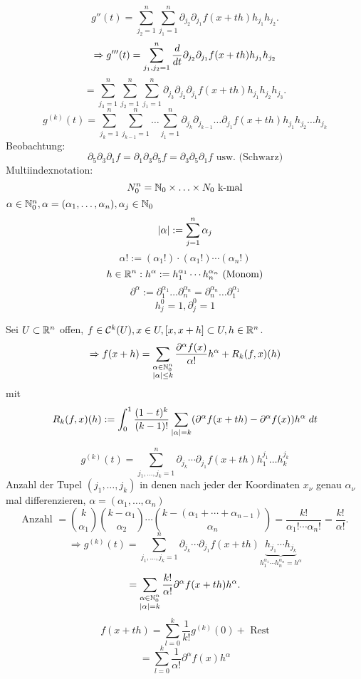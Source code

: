 \documentclass[../ana2.tex]{subfiles}
\begin{document}
\[ g''(t) = \sum_{j_2=1}^n \sum_{j_1=1}^n 
\partial_{j_2} \partial_{j_1} f(x + th) h_{j_1} h_{j_2}. \]
\[ \Rightarrow g'''(t) = \sum_{j_1,j_2 = 1}^n 
\ddx{t} \partial_{j_2} \partial_{j_1} f(x + th) h_{j_1} h_{j_2} \]
\[ = \sum_{j_3 = 1}^n\sum_{j_2 = 1}^n \sum_{j_1=1}^n \partial_{j_3} \partial_{j_2} \partial_{j_1}
f(x + th) h_{j_1} h_{j_2} h_{j_3}. \]
\[ g^{(k)}(t) = \sum_{j_k=1}^n \sum_{j_{k-1}=1}^n \ldots \sum_{j_{1}=1}^n 
\partial_{j_k}\partial_{j_{k-1}}\ldots\partial_{j_1} f(x+th)h_{j_1}h_{j_2}\ldots h_{j_k} \]
Beobachtung: 
\[ \partial_5 \partial_3 \partial_1f  = \partial_1 \partial_3 \partial_5 f
= \partial_3 \partial_5 \partial_1 f \text{ usw. (Schwarz)} \]
Multiindexnotation:
\[ N_0^n = \N_0 \times \ldots \times N_0 \text{ k-mal} \]
\( \alpha \in \N_0^n, \alpha =(\alpha_1, \ldots, \alpha_n), \alpha_j \in \N_0 \)
\[ \abs{\alpha} := \sum_{j=1}^n \alpha_j \]
\[ \alpha! := (\alpha_1!) \cdot (\alpha_1!) \cdots (\alpha_n!) \]
\[ h \in \R^n: h^\alpha := h_1^{\alpha_1} \cdots h_n^{\alpha_n} \text{ (Monom)} \]
\[ \partial^\alpha := \partial_1^{\alpha_1}\ldots \partial_n^{\alpha_n}
= \partial_n^{\alpha_n}\ldots\partial_1^{\alpha_1} \]
\[ h_j^0 = 1, \partial_j^0 = 1 \]
\begin{satz}
    Sei \( U \subset \R^n \) offen, \( f \in \mathcal{C}^k(U), 
    x \in U, [x,x+h] \subset U, h \in \R^n \).
    \[ \Rightarrow f(x + h) = \sum_{\substack{\alpha \in \N_0^n \\ \abs{\alpha} \leq k}} 
    \frac{ \partial^\alpha f(x) }{\alpha!} h^\alpha 
    + R_k(f, x)(h) \]
    mit 
    \[R_k(f,x)(h) := \integralx{\frac{(1-t)^k}{(k-1)!} 
    \sum_{\abs{\alpha} = k} 
    (\partial^\alpha f(x+th)-\partial^\alpha f(x))h^\alpha}{0}{1}{t}\]   
\end{satz}
\begin{bew}
    \[ g^{(k)}(t) = \sum_{j_1,\ldots, j_k = 1}^n 
    \partial_{j_k}\cdots \partial_{j_1} f(x+th)h_1^{j_1}\ldots h_k^{j_k} \]
    Anzahl der Tupel \( (j_1, \ldots, j_k) \) 
    in denen nach jeder der Koordinaten 
    \( x_\nu \) genau \( \alpha_\nu \) mal differenzieren, 
    \( \alpha = (\alpha_1, \ldots, \alpha_n) \) \\
    \[ \text{Anzahl } = \binom{k}{\alpha_1} \binom{k - \alpha_1}{\alpha_2} \cdots 
    \binom{k - (\alpha_1 + \cdots + \alpha_{n-1})}{\alpha_n}
    = \frac{ k! }{\alpha_1! \cdots \alpha_n!} 
    = \frac{k!}{\alpha!}. \]
    \[ \Rightarrow g^{(k)}(t) = \sum_{j_1,\ldots,j_k = 1}^n 
    \partial_{j_k}\cdots\partial_{j_1} f(x+th) 
    \underbrace{h_{j_1}\cdots h_{j_k}}_{h_1^{\alpha_1}\cdots h_n^{\alpha_n} = h^\alpha} \]
    \[ = \sum_{\substack{\alpha \in \N_0^n\\ \abs{\alpha}=k}} \frac{k!}{\alpha!}
    \partial^\alpha f(x+th) h^\alpha. \]
    \[ f(x + th) = \sum_{l=0}^k \frac{1}{k!} g^{(k)}(0) + \text{ Rest} \]
    \[ = \sum_{l=0}^k \frac{1}{\alpha!} \partial^\alpha f(x) h^\alpha \]
\end{bew}
\end{document}

